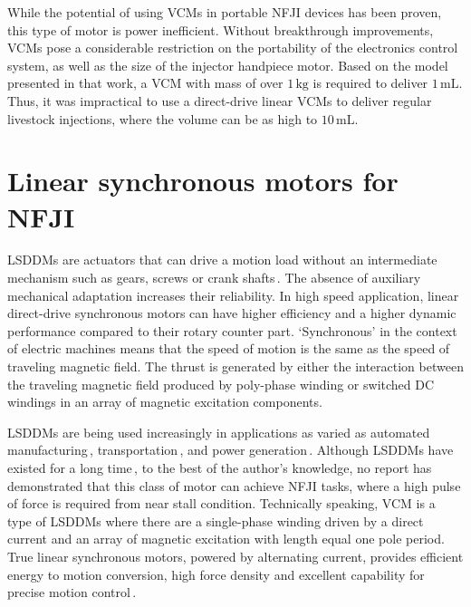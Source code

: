     While the potential of using \acsp{VCM} in portable \acs{NFJI} devices has been proven, this type of motor is power inefficient. Without breakthrough improvements, \acsp{VCM} pose a considerable restriction on the portability of the electronics control system, as well as the size of the injector handpiece motor. Based on the model presented in that work, a \acs{VCM} with mass of over $\mathrm{1\,kg}$ is required to deliver $\mathrm{1\,mL}$. Thus, it was impractical to use a direct-drive linear \acsp{VCM} to deliver regular livestock injections, where the volume can be as high to $\mathrm{10\,mL}$. 

\section{Linear synchronous motors for NFJI}        \label{Chapter:background/linear synchronous motors for NFJI}

    
    \acp{LSDDM} are actuators that can drive a motion load without an intermediate mechanism such as gears, screws or crank shafts\,\cite{JacekF.GierasZbigniewJ.Piech2017LinearSystems}. The absence of auxiliary mechanical adaptation increases their reliability. In high speed application, linear direct-drive synchronous motors can have higher efficiency and a higher dynamic performance compared to their rotary counter part. ‘Synchronous’ in the context of electric machines means that the speed of motion is the same as the speed of traveling magnetic field. The thrust is generated by either the interaction between the traveling magnetic field produced by poly-phase winding or switched DC windings in an array of magnetic excitation components. 
    
    \acsp{LSDDM} are being used increasingly in applications as varied as automated manufacturing\,\cite{Meessen2010Three-dimensionalArray,Overboom2010DesignZ-module}, transportation\,\cite{Gysen2011EfficiencySuspensionb,Cao2012,WenxiangZhao2012DesignApplications}, and power generation\,\cite{Li2011,Baker2019AEnergy}. Although \acsp{LSDDM} have existed for a long time\,\cite{Boldea1997}, to the best of the author’s knowledge, no report has demonstrated that this class of motor can achieve \acs{NFJI} tasks, where a high pulse of force is required from near stall condition. Technically speaking, \acs{VCM} is a type of \acsp{LSDDM} where there are a single-phase winding driven by a direct current and an array of magnetic excitation with length equal one pole period. True linear synchronous motors, powered by alternating current, provides efficient energy to motion conversion, high force density and excellent capability for precise motion control\,\cite{Trumper1994,Levi1973,Budig2000}.
    
